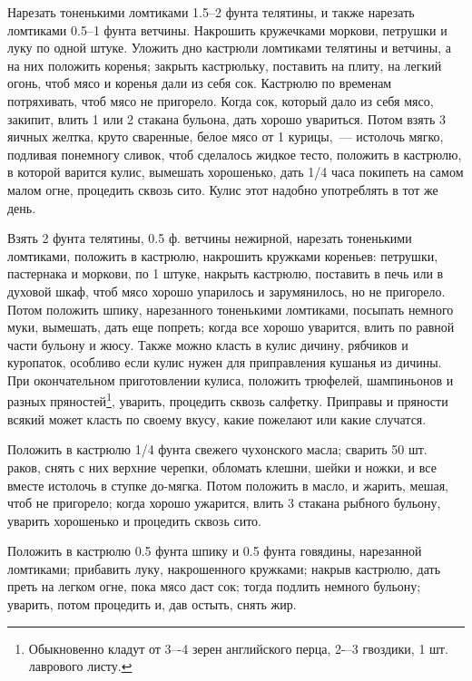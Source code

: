 
Нарезать тоненькими ломтиками 1.5--2 фунта телятины, и также нарезать ломтиками 0.5--1 фунта ветчины. Накрошить кружечками моркови, петрушки и луку по одной штуке. Уложить дно кастрюли ломтиками телятины и ветчины, а на них положить коренья; закрыть кастрюльку, поставить на плиту, на легкий огонь, чтоб мясо и коренья дали из себя сок. Кастрюлю по временам потряхивать, чтоб мясо не пригорело. Когда сок, который дало из себя мясо, закипит, влить 1 или 2 стакана бульона, дать хорошо увариться. Потом взять 3 яичных желтка, круто сваренные, белое мясо от 1 курицы,~--- истолочь мягко, подливая понемногу сливок, чтоб сделалось жидкое тесто, положить в кастрюлю, в которой варится кулис, вымешать хорошенько, дать 1/4 часа покипеть на самом малом огне, процедить сквозь сито. Кулис этот надобно употреблять в тот же день.


Взять 2 фунта телятины, 0.5 ф. ветчины нежирной, нарезать тоненькими ломтиками, положить в кастрюлю, накрошить кружками кореньев: петрушки, пастернака и моркови, по 1 штуке, накрыть кастрюлю, поставить в печь или в духовой шкаф, чтоб мясо хорошо упарилось и зарумянилось, но не пригорело. Потом положить шпику, нарезанного тоненькими ломтиками, посыпать немного муки, вымешать, дать еще попреть; когда все хорошо уварится, влить по равной части бульону и жюсу. Также можно класть в кулис дичину, рябчиков и куропаток, особливо если кулис нужен для приправления кушанья из дичины. При окончательном приготовлении кулиса, положить трюфелей, шампиньонов и разных пряностей\footnote{Обыкновенно кладут от 3–-4 зерен английского перца, 2-–3 гвоздики, 1 шт. лаврового листу.}, уварить, процедить сквозь салфетку. Приправы и пряности всякий может класть по своему вкусу, какие пожелают или какие случатся.


Положить в кастрюлю 1/4 фунта свежего чухонского масла; сварить 50 шт. раков, снять с них верхние черепки, обломать клешни, шейки и ножки, и все вместе истолочь в ступке до-мягка. Потом положить в масло, и жарить, мешая, чтоб не пригорело; когда хорошо ужарится, влить 3 стакана рыбного бульону, уварить хорошенько и процедить сквозь сито.


Положить в кастрюлю 0.5 фунта шпику и 0.5 фунта говядины, нарезанной ломтиками; прибавить луку, накрошенного кружками; накрыв кастрюлю, дать преть на легком огне, пока мясо даст сок; тогда подлить немного бульону; уварить, потом процедить и, дав остыть, снять жир.

